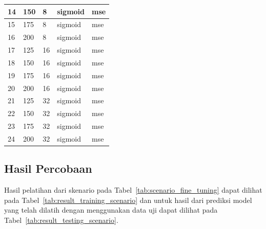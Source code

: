 \begin{longtable}[c]{|l|l|l|l|l|}
  14       & 150   & 8           & sigmoid              & mse                       \\ \hline
  15       & 175   & 8           & sigmoid              & mse                       \\ \hline
  16       & 200   & 8           & sigmoid              & mse                       \\ \hline
  17       & 125   & 16          & sigmoid              & mse                       \\ \hline
  18       & 150   & 16          & sigmoid              & mse                       \\ \hline
  19       & 175   & 16          & sigmoid              & mse                       \\ \hline
  20       & 200   & 16          & sigmoid              & mse                       \\ \hline
  21       & 125   & 32          & sigmoid              & mse                       \\ \hline
  22       & 150   & 32          & sigmoid              & mse                       \\ \hline
  23       & 175   & 32          & sigmoid              & mse                       \\ \hline
  24       & 200   & 32          & sigmoid              & mse                       \\ \hline
\end{longtable}

\subsection{Hasil Percobaan}
Hasil pelatihan dari skenario pada Tabel~\ref{tab:scenario_fine_tuning} dapat dilihat pada
Tabel~\ref{tab:result_training_scenario} dan untuk hasil dari prediksi model yang telah dilatih dengan
menggunakan data uji dapat dilihat pada Tabel~\ref{tab:result_testing_scenario}.


